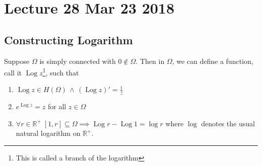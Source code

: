 \documentclass[11pt, oneside]{book}
\DeclareMathOperator{\Log}{Log}
\begin{document}


\chapter{Lecture 28 Mar 23 2018}
  \label{chapter:lecture_28_mar_23_2018}

\section{Constructing Logarithm} %
\label{sec:constructing_logarithm}

\begin{thm}[Theorem 17]\label{thm:theorem_17}
  Suppose $\Omega$ is simply connected with $0 \not\in \Omega$. Then in $\Omega$, we can define a function, call it $\Log z$\footnote{This is called a branch of the logarithm}, such that
  \begin{enumerate}
    \item $\Log z \in H(\Omega) \, \land \, \left( \Log z \right)' = \frac{1}{z}$
    \item $e^{\Log z} = z$ for all $z \in \Omega$
    \item $\forall r \in \mathbb{R}^+ \; [1, r] \subseteq \Omega \implies \Log r - \Log 1 = \log r$ where $\log$ denotes the usual natural logarithm on $\mathbb{R}^+$.
  \end{enumerate}
\end{thm}
\end{document}
